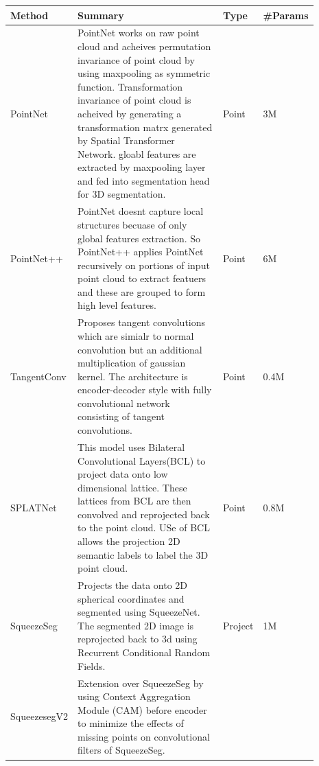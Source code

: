 \begin{longtable}{|p{0.15\linewidth} | p{0.59\linewidth}| p{0.06\linewidth} |p{0.09\linewidth}|}
        \hline
        \textbf{Method} & \textbf{Summary} & \textbf{Type} & \textbf{\#Params} \\
        \hline 
        PointNet\cite{Qi_2017_CVPR_pointnet} &
        PointNet works on raw point cloud and acheives permutation invariance of point cloud by using maxpooling as symmetric function.
        Transformation invariance of point cloud is acheived by generating a transformation matrx generated by Spatial Transformer Network.
        gloabl features are extracted by maxpooling layer and fed into segmentation head for 3D segmentation.
        & Point & 3M \\
        \hline
        PointNet++\cite{qi2017pointnet++} &
        PointNet doesnt capture local structures becuase of only global features extraction.
        So PointNet++ applies PointNet recursively on portions of input point cloud to extract featuers and these are grouped to form high level features.
        & Point & 6M \\
        \hline
        TangentConv\cite{Tatarchenko_2018_CVPR_tangconv} &
        Proposes tangent convolutions which are simialr to normal convolution but an additional multiplication of gaussian kernel.
        The architecture is encoder-decoder style with fully convolutional network consisting of tangent convolutions.
        & Point & 0.4M\\
        \hline
        SPLATNet\cite{Su_2018_CVPR_splatnet} &
        This model uses Bilateral Convolutional Layers(BCL) to project data onto low dimensional lattice.
        These lattices from BCL are then convolved and reprojected back to the point cloud.
        USe of BCL allows the projection 2D semantic labels to label the 3D point cloud.
        & Point & 0.8M \\
        \hline
        SqueezeSeg\cite{Sequeseseg_2018} &
        Projects the data onto 2D spherical coordinates and segmented using SqueezeNet.
        The segmented 2D image is reprojected back to 3d using Recurrent Conditional Random Fields.
        & Project & 1M \\
        \hline
        SqueezesegV2\cite{SqueezeSegv2} &
        Extension over SqueezeSeg by using Context Aggregation Module (CAM) before encoder to minimize the effects of missing points on convolutional filters of SqueezeSeg.

\end{longtable}
